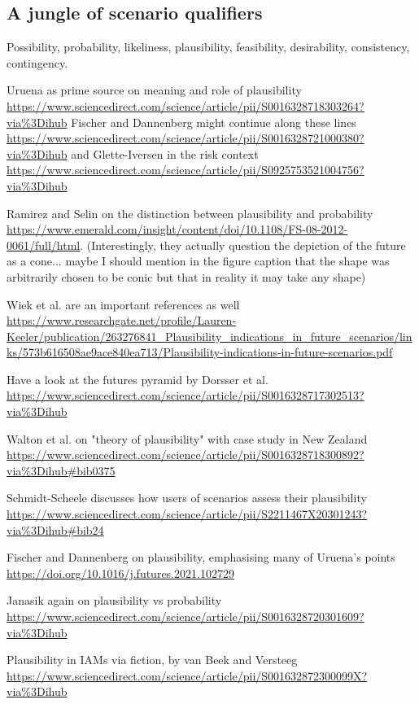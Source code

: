 \documentclass{article}
\begin{document}
\begin{refsection}
\subsection{A jungle of scenario qualifiers}
Possibility, probability, likeliness, plausibility, feasibility, desirability, consistency, contingency.

Uruena as prime source on meaning and role of plausibility \url{https://www.sciencedirect.com/science/article/pii/S0016328718303264?via%3Dihub} Fischer and Dannenberg might continue along these lines \url{https://www.sciencedirect.com/science/article/pii/S0016328721000380?via%3Dihub} and Glette-Iversen in the risk context \url{https://www.sciencedirect.com/science/article/pii/S0925753521004756?via%3Dihub}

Ramirez and Selin on the distinction between plausibility and probability \url{https://www.emerald.com/insight/content/doi/10.1108/FS-08-2012-0061/full/html}. (Interestingly, they actually question the depiction of the future as a cone... maybe I should mention in the figure caption that the shape was arbitrarily chosen to be conic but that in reality it may take any shape)

Wiek et al. are an important references as well \url{https://www.researchgate.net/profile/Lauren-Keeler/publication/263276841_Plausibility_indications_in_future_scenarios/links/573b616508ae9ace840ea713/Plausibility-indications-in-future-scenarios.pdf}

Have a look at the futures pyramid by Dorsser et al. \url{https://www.sciencedirect.com/science/article/pii/S0016328717302513?via%3Dihub}

Walton et al. on "theory of plausibility" with case study in New Zealand \url{https://www.sciencedirect.com/science/article/pii/S0016328718300892?via%3Dihub#bib0375}

Schmidt-Scheele discusses how users of scenarios assess their plausibility \url{https://www.sciencedirect.com/science/article/pii/S2211467X20301243?via%3Dihub#bib24}

Fischer and Dannenberg on plausibility, emphasising many of Uruena's points \url{https://doi.org/10.1016/j.futures.2021.102729}

Janasik again on plausibility vs probability \url{https://www.sciencedirect.com/science/article/pii/S0016328720301609?via%3Dihub}

Plausibility in IAMs via fiction, by van Beek and Versteeg \url{https://www.sciencedirect.com/science/article/pii/S001632872300099X?via%3Dihub}


\end{refsection}
\end{document}
